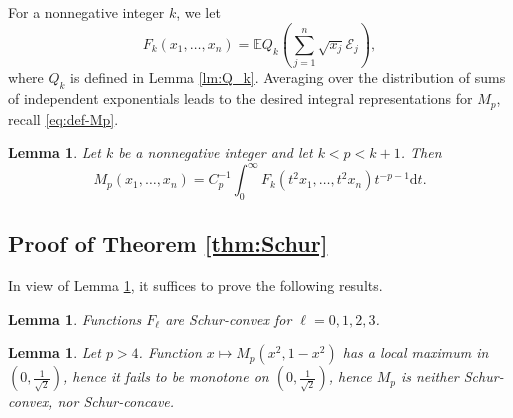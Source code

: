 \documentclass[10pt]{article}
\newcommand{\dd}{\mathrm{d}}
\newcommand{\E}{\mathbb{E}}
\newcommand{\1}{\textbf{1}}
\newcommand{\cE}{\mathscr{E}}
\newtheorem{lemma}[theorem]{Lemma}
\theoremstyle{remark}
\theoremstyle{definition}
\begin{document}
For a nonnegative integer $k$, we let
\[
F_k(x_1, \dots, x_n) = \E Q_k\left(\sum_{j=1}^n \sqrt{x_j}\cE_j\right),
\]
where $Q_k$ is defined in Lemma \ref{lm:Q_k}.
Averaging over the distribution of sums of independent exponentials leads to the desired integral representations for $M_p$, recall \eqref{eq:def-Mp}. 

\begin{lemma}\label{lm:Mp-formula}
Let $k$ be a nonnegative integer and let $k < p < k+1$. Then
\[ 
M_p(x_1, \dots, x_n) = C_p^{-1}\int_0^\infty F_k(t^2x_1, \dots, t^2x_n)t^{-p-1}\dd t.
 \]
\end{lemma}


\subsection{Proof of Theorem \ref{thm:Schur}}

In view of Lemma \ref{lm:Mp-formula}, it suffices to prove the following results.

\begin{lemma}\label{lm:F}
Functions $F_\ell$ are Schur-convex for $\ell = 0, 1, 2, 3$.
\end{lemma}


\begin{lemma}\label{lm:failure}
Let $p > 4$. Function $x \mapsto M_p(x^2,1-x^2)$ has a local maximum in $(0, \frac{1}{\sqrt2})$, hence it fails to be monotone on $(0, \frac{1}{\sqrt2})$, hence $M_p$ is neither Schur-convex, nor Schur-concave.
\end{lemma}
\end{document}
